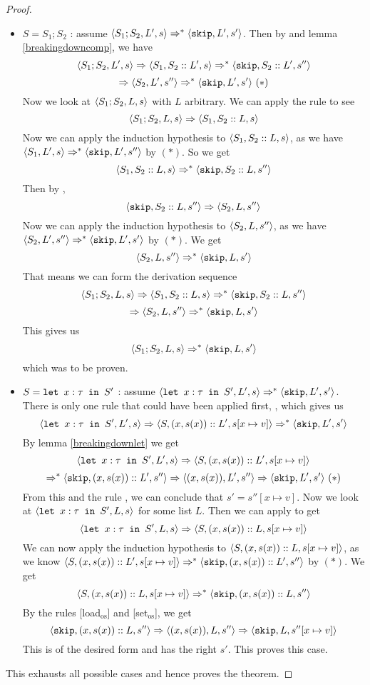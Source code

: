 \begin{proof}
\begin{itemize}[noitemsep]
    \item $S = S_1; S_2$ : assume $\langle  S_1;S_2, L',  s \rangle \Rightarrow ^{*} \langle \texttt{skip}, L', s' \rangle$. Then by \compsos and lemma \ref{breakingdowncomp}, we have 
    $$\langle S_1;S_2, L', s \rangle \Rightarrow \langle S_1, S_2::L', s \rangle \Rightarrow ^{*} \langle \texttt{skip}, S_2::L', s'' \rangle$$ $$\Rightarrow \langle S_2, L', s'' \rangle \Rightarrow ^{*} \langle \texttt{skip}, L', s' \rangle ~( * )$$
    Now we look at $\langle S_1;S_2, L, s \rangle$ with $L$ arbitrary. We can apply the rule \compsos to see $$\langle S_1;S_2, L, s \rangle \Rightarrow \langle S_1, S_2::L, s \rangle$$ Now we can apply the induction hypothesis to $\langle S_1, S_2::L, s \rangle$, as we have $\langle S_1, L', s \rangle \Rightarrow ^{*} \langle \texttt{skip}, L', s'' \rangle$ by $( * )$. So we get 
    $$\langle S_1, S_2::L, s \rangle \Rightarrow ^{*} \langle \texttt{skip}, S_2::L, s'' \rangle$$
    Then by \loadsos, 
    $$\langle \texttt{skip}, S_2::L, s'' \rangle \Rightarrow \langle S_2, L, s'' \rangle$$
    Now we can apply the induction hypothesis to $\langle S_2, L, s'' \rangle$, as we have $\langle S_2, L', s'' \rangle \Rightarrow ^{*} \langle \texttt{skip}, L', s' \rangle$ by $( * )$. We get 
    $$\langle S_2, L, s'' \rangle \Rightarrow ^{*} \langle \texttt{skip}, L, s' \rangle$$
    That means we can form the derivation sequence $$\langle S_1;S_2, L, s \rangle \Rightarrow \langle S_1, S_2::L, s \rangle \Rightarrow ^{*} \langle \texttt{skip}, S_2::L, s'' \rangle $$ $$ \Rightarrow \langle S_2, L, s'' \rangle \Rightarrow ^{*} \langle \texttt{skip}, L, s' \rangle$$
    This gives us 
    $$\langle S_1;S_2, L, s \rangle \Rightarrow ^{*} \langle \texttt{skip}, L, s' \rangle$$
    which was to be proven. 
        
    \item $S = \texttt{let }x : \tau \texttt{ in } S'$ : assume $\langle \texttt{let }x : \tau \texttt{ in } S', L', s \rangle \Rightarrow ^{*} \langle \texttt{skip}, L', s' \rangle$. There is only one rule that could have been applied first, , which gives us 
    $$\langle \texttt{let }x : \tau \texttt{ in } S', L', s \rangle \Rightarrow \langle S, (x,s(x))::L', s[x\mapsto v] \rangle \Rightarrow ^{*} \langle \texttt{skip}, L', s' \rangle$$
    By lemma \ref{breakingdownlet} we get 
    $$\langle \texttt{let }x : \tau \texttt{ in } S', L', s \rangle \Rightarrow \langle S, (x,s(x))::L', s[x\mapsto v] \rangle$$ $$\Rightarrow ^{*} \langle \texttt{skip}, (x,s(x))::L', s'' \rangle \Rightarrow \langle (x,s(x)), L', s'' \rangle \Rightarrow \langle \texttt{skip}, L', s' \rangle ~ ( * )$$
    From this and the rule \setsos, we can conclude that $s' = s''[x\mapsto v]$.
    Now we look at $\langle \texttt{let }x : \tau \texttt{ in } S', L, s \rangle$ for some list $L$. Then we can apply  to get 
    $$\langle \texttt{let }x : \tau \texttt{ in } S', L, s \rangle \Rightarrow \langle S, (x,s(x))::L, s[x\mapsto v] \rangle$$
    We can now apply the induction hypothesis to $\langle S, (x,s(x))::L, s[x\mapsto v] \rangle$, as we know $\langle S, (x,s(x))::L', s[x\mapsto v] \rangle \Rightarrow ^{*} \langle \texttt{skip}, (x,s(x))::L', s'' \rangle$ by $( * )$. We get
    $$\langle S, (x,s(x))::L, s[x\mapsto v] \rangle \Rightarrow ^{*} \langle \texttt{skip}, (x,s(x))::L, s'' \rangle$$
    By the rules [load$_{\textrm{os}}$] and [set$_{\textrm{os}}$], we get 
    $$\langle \texttt{skip}, (x,s(x))::L, s'' \rangle \Rightarrow \langle (x,s(x)), L, s'' \rangle \Rightarrow \langle \texttt{skip}, L, s''[x \mapsto v] \rangle$$
    This is of the desired form and has the right $s'$. This proves this case.
\end{itemize}
This exhausts all possible cases and hence proves the theorem.
\end{proof}

